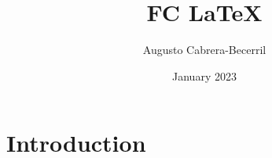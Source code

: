 \documentclass{article}
\title{FC \LaTeX}
\author{Augusto Cabrera-Becerril}
\date{January 2023}
\begin{document}
\maketitle

\section{Introduction}
\end{document}

